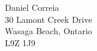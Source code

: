 \documentclass[fleqn,11pt]{article}
\begin{document}
Daniel Correia\\
30 Lamont Creek Drive\\
Wasaga Beach, Ontario\\
L9Z 1J9\\
 \\
  \\

\noindent\par
\noindent{}



\restoregeometry


\clearpage
\end{document}
